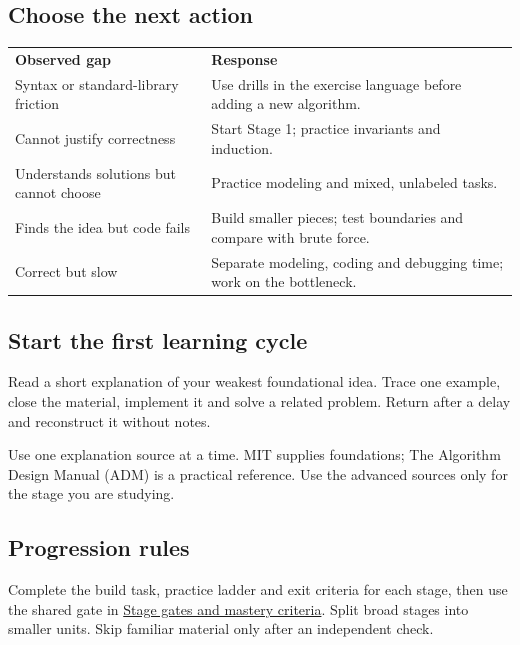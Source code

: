 \documentclass[11pt,letterpaper]{article}
\begin{document}
\subsection*{Choose the next action}

\begin{center}
\small
\begin{tabular}{>{\raggedright\arraybackslash}p{}>{\raggedright\arraybackslash}p{}}
\textbf{Observed gap} & \textbf{Response} \\
Syntax or standard-library friction & Use drills in the exercise language before adding a new algorithm. \\
Cannot justify correctness & Start Stage 1; practice invariants and induction. \\
Understands solutions but cannot choose & Practice modeling and mixed, unlabeled tasks. \\
Finds the idea but code fails & Build smaller pieces; test boundaries and compare with brute force. \\
Correct but slow & Separate modeling, coding and debugging time; work on the bottleneck. \\
\end{tabular}
\end{center}

\subsection*{Start the first learning cycle}

Read a short explanation of your weakest foundational idea. Trace one example, close the material, implement it and solve a related problem. Return after a delay and reconstruct it without notes.

Use one explanation source at a time. MIT supplies foundations; The Algorithm Design Manual (ADM) is a practical reference. Use the advanced sources only for the stage you are studying.

\subsection*{Progression rules}

Complete the build task, practice ladder and exit criteria for each stage, then use the shared gate in \hyperref[sec:22]{Stage gates and mastery criteria}. Split broad stages into smaller units. Skip familiar material only after an independent check.
\end{document}

